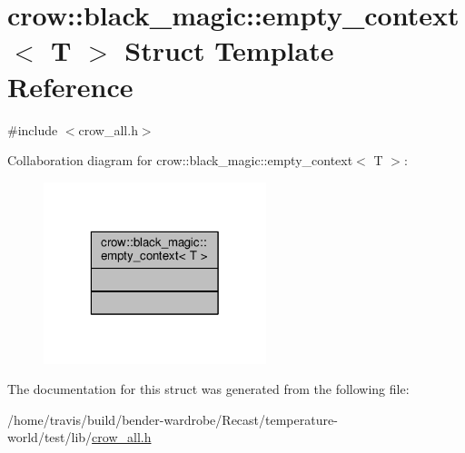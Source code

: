 \hypertarget{structcrow_1_1black__magic_1_1empty__context}{\section{crow\-:\-:black\-\_\-magic\-:\-:empty\-\_\-context$<$ T $>$ Struct Template Reference}
\label{structcrow_1_1black__magic_1_1empty__context}
}


{\ttfamily \#include $<$crow\-\_\-all.\-h$>$}



Collaboration diagram for crow\-:\-:black\-\_\-magic\-:\-:empty\-\_\-context$<$ T $>$\-:
\nopagebreak
\begin{figure}[H]
\begin{center}
\leavevmode
\includegraphics[width=184pt]{structcrow_1_1black__magic_1_1empty__context__coll__graph}
\end{center}
\end{figure}


The documentation for this struct was generated from the following file\-:\begin{DoxyCompactItemize}
\item 
/home/travis/build/bender-\/wardrobe/\-Recast/temperature-\/world/test/lib/\hyperlink{crow__all_8h}{crow\-\_\-all.\-h}\end{DoxyCompactItemize}
